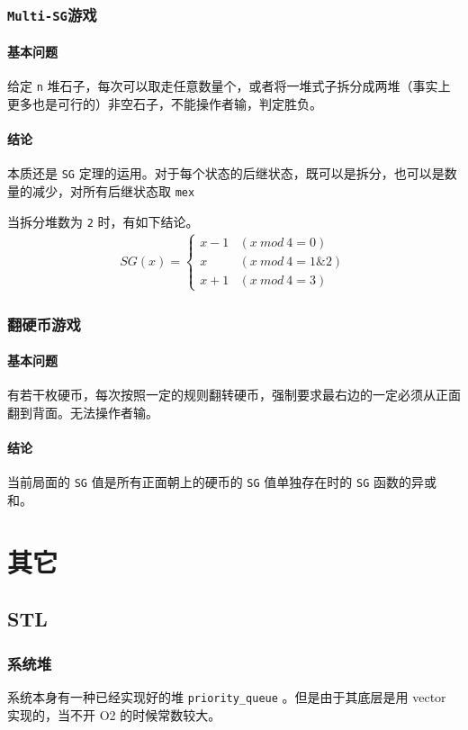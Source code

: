 \documentclass[UTF-8]{ctexart}
\begin{document}
	\subsubsection{\texttt{Multi-SG}游戏}
	\paragraph{基本问题} 给定 \texttt{n} 堆石子，每次可以取走任意数量个，或者将一堆式子拆分成两堆（事实上更多也是可行的）非空石子，不能操作者输，判定胜负。
	\paragraph{结论} 本质还是 \texttt{SG} 定理的运用。对于每个状态的后继状态，既可以是拆分，也可以是数量的减少，对所有后继状态取 \texttt{mex}
	
	当拆分堆数为 \texttt{2} 时，有如下结论。
	\begin{align}
	SG(x)=\begin{cases} x-1&(x\ mod\ 4=0)\\ x&(x\ mod\ 4=1\&2)\\ x+1&(x\ mod\ 4=3) \end{cases}\nonumber		
	\end{align}
	\subsubsection{翻硬币游戏}
	\paragraph{基本问题}有若干枚硬币，每次按照一定的规则翻转硬币，强制要求最右边的一定必须从正面翻到背面。无法操作者输。
	\paragraph{结论}当前局面的 \texttt{SG} 值是所有正面朝上的硬币的 \texttt{SG} 值单独存在时的 \texttt{SG} 函数的异或和。
	\section{其它}
		\subsection{STL}
		\subsubsection{系统堆}
		系统本身有一种已经实现好的堆 \texttt{priority_queue} 。但是由于其底层是用 vector 实现的，当不开 O2 的时候常数较大。
		
\end{document}
